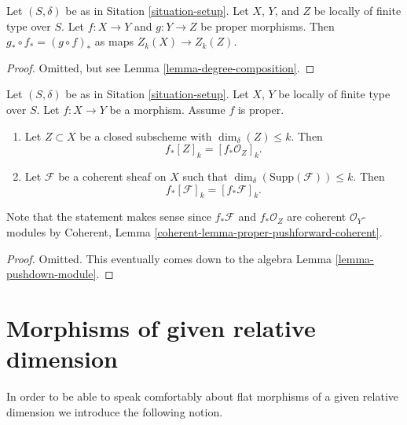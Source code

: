\begin{lemma}
\label{lemma-compose-pushforward}
Let $(S, \delta)$ be as in Sitation \ref{situation-setup}.
Let $X$, $Y$, and $Z$ be locally of finite type over $S$.
Let $f : X \to Y$ and $g : Y \to Z$ be proper morphisms.
Then $g_* \circ f_* = (g \circ f)_*$ as maps $Z_k(X) \to Z_k(Z)$.
\end{lemma}

\begin{proof}
Omitted, but see Lemma \ref{lemma-degree-composition}.
\end{proof}

\begin{lemma}
\label{lemma-cycle-push-sheaf}
Let $(S, \delta)$ be as in Sitation \ref{situation-setup}.
Let $X$, $Y$ be locally of finite type over $S$.
Let $f : X \to Y$ be a morphism.
Assume $f$ is proper.
\begin{enumerate}
\item Let $Z \subset X$ be a closed subscheme with $\dim_\delta(Z) \leq k$.
Then
$$
f_*[Z]_k = [f_*{\mathcal O}_Z]_k.
$$
\item Let $\mathcal{F}$ be a coherent sheaf on $X$ such that
$\dim_\delta(\text{Supp}(\mathcal{F})) \leq k$. Then
$$
f_*[\mathcal{F}]_k = [f_*{\mathcal F}]_k.
$$
\end{enumerate}
Note that the statement makes sense since $f_*\mathcal{F}$ and
$f_*\mathcal{O}_Z$ are coherent $\mathcal{O}_Y$-modules by
Coherent, Lemma \ref{coherent-lemma-proper-pushforward-coherent}.
\end{lemma}

\begin{proof}
Omitted. This eventually comes down to the algebra
Lemma \ref{lemma-pushdown-module}.
\end{proof}



















\section{Morphisms of given relative dimension}
\label{section-relative-dimension}

\noindent
In order to be able to speak comfortably about flat morphisms of a
given relative dimension we introduce the following notion.

